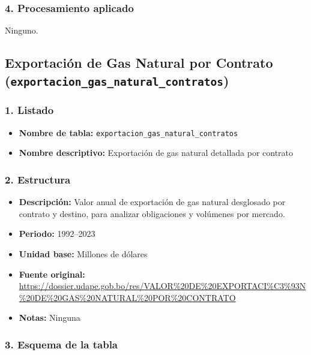 \documentclass[12pt,a4paper]{article}
\begin{document}
\subsubsection*{4. Procesamiento aplicado}
Ninguno.  



\newpage
\subsection{Exportación de Gas Natural por Contrato\\
\small(\texttt{exportacion\_gas\_natural\_contratos})}

\subsubsection*{1. Listado}
\begin{itemize}
  \item \textbf{Nombre de tabla:} \texttt{exportacion\_gas\_natural\_contratos}
  \item \textbf{Nombre descriptivo:} Exportación de gas natural detallada por contrato
\end{itemize}

\subsubsection*{2. Estructura}
\begin{itemize}
  \item \textbf{Descripción:} Valor anual de exportación de gas natural desglosado por contrato y destino, para analizar obligaciones y volúmenes por mercado.
  \item \textbf{Periodo:} 1992--2023
  \item \textbf{Unidad base:} Millones de dólares
  \item \textbf{Fuente original:} \url{https://dossier.udape.gob.bo/res/VALOR%20DE%20EXPORTACI%C3%93N%20DE%20GAS%20NATURAL%20POR%20CONTRATO}
  \item \textbf{Notas:} Ninguna
\end{itemize}

\subsubsection*{3. Esquema de la tabla}
\end{document}
